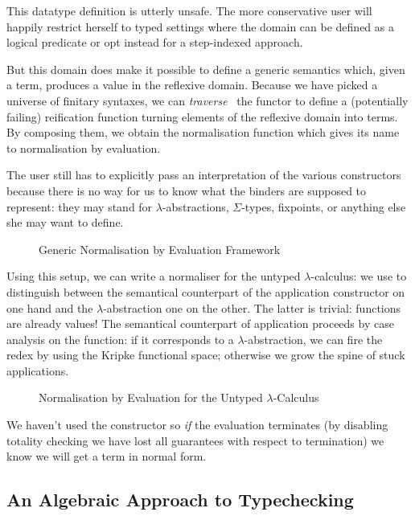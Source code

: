 This datatype definition is utterly unsafe. The more conservative
user will happily restrict herself to typed settings where the
domain can be defined as a logical predicate or opt instead for
a step-indexed approach.

But this domain does make it possible to define a generic 
semantics which, given a term, produces a value in the reflexive
domain. Because we have picked a universe of finitary syntaxes, we
can \emph{traverse}~\cite{mcbride_paterson_2008} the functor to define
a (potentially failing) reification function turning elements of the
reflexive domain into terms. By composing them, we obtain the
normalisation function which gives its name to normalisation by
evaluation.

The user still has to explicitly pass an interpretation of
the various constructors because there is no way for us to
know what the binders are supposed to represent: they may
stand for $\lambda$-abstractions, $\Sigma$-types, fixpoints, or
anything else she may want to define.


\begin{figure}[h]
\caption{Generic Normalisation by Evaluation Framework}
\end{figure}

Using this setup, we can write a normaliser for the untyped
$\lambda$-calculus: we use  to distinguish between
the semantical counterpart of the application constructor on
one hand and the $\lambda$-abstraction one on the other.
The latter is trivial: functions are already
values! The semantical counterpart of application proceeds by
case analysis on the function: if it corresponds to a
$\lambda$-abstraction, we can fire the redex by using the Kripke
functional space; otherwise we grow the spine of stuck
applications.

\begin{figure}[h]
\caption{Normalisation by Evaluation for the Untyped $\lambda$-Calculus}
\end{figure}

We haven't used the  constructor so \emph{if} the evaluation terminates
(by disabling totality checking we have lost all guarantees with respect to
termination) we know we will get a term in normal form.

\subsection{An Algebraic Approach to Typechecking}

